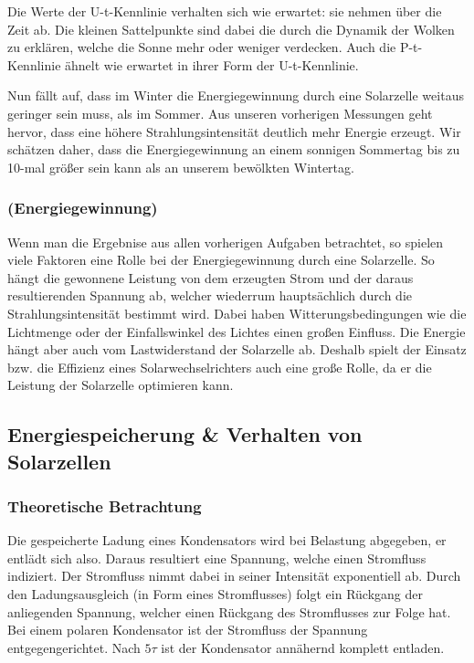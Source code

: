 
Die Werte der U-t-Kennlinie verhalten sich wie erwartet: sie nehmen über die Zeit ab.
Die kleinen Sattelpunkte sind dabei die durch die Dynamik der Wolken zu erklären, welche die Sonne mehr oder weniger verdecken.
Auch die P-t-Kennlinie ähnelt wie erwartet in ihrer Form der U-t-Kennlinie.

Nun fällt auf, dass im Winter die Energiegewinnung durch eine Solarzelle weitaus geringer sein muss, als im Sommer.
Aus unseren vorherigen Messungen geht hervor, dass eine höhere Strahlungsintensität deutlich mehr Energie erzeugt.
Wir schätzen daher, dass die Energiegewinnung an einem sonnigen Sommertag bis zu 10-mal größer sein kann als an unserem bewölkten Wintertag.

\subsubsection{(Energiegewinnung)}

Wenn man die Ergebnise aus allen vorherigen Aufgaben betrachtet, so spielen viele Faktoren eine Rolle bei der Energiegewinnung durch eine Solarzelle. So hängt die gewonnene Leistung von dem erzeugten Strom und der daraus resultierenden Spannung ab, welcher wiederrum hauptsächlich durch die Strahlungsintensität bestimmt wird. Dabei haben Witterungsbedingungen wie die Lichtmenge oder der Einfallswinkel des Lichtes einen großen Einfluss.
Die Energie hängt aber auch vom Lastwiderstand der Solarzelle ab. Deshalb spielt der Einsatz bzw. die Effizienz eines Solarwechselrichters auch eine große Rolle, da er die Leistung der Solarzelle optimieren kann.

\clearpage
\subsection{Energiespeicherung \& Verhalten von Solarzellen}

\subsubsection{Theoretische Betrachtung}

Die gespeicherte Ladung eines Kondensators wird bei Belastung abgegeben, er entlädt sich also. Daraus resultiert eine Spannung, welche einen Stromfluss indiziert. Der Stromfluss nimmt dabei in seiner Intensität exponentiell ab. Durch den Ladungsausgleich (in Form eines Stromflusses) folgt ein Rückgang der anliegenden Spannung, welcher einen Rückgang des Stromflusses zur Folge hat. Bei einem polaren Kondensator ist der Stromfluss der Spannung entgegengerichtet.
Nach $5\tau$ ist der Kondensator annähernd komplett entladen. \cite{Fachkundebuch}

